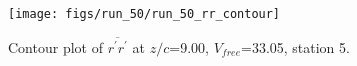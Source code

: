 \begin{figure}[H]
\centering
\texttt{[image: figs/run\_50/run\_50\_rr\_contour]}
\caption{Contour plot of $\overline{r^\prime r^\prime}$ at $z/c$=9.00, $V_{free}$=33.05, station 5.}
\label{fig:run_50_rr_contour}
\end{figure}


